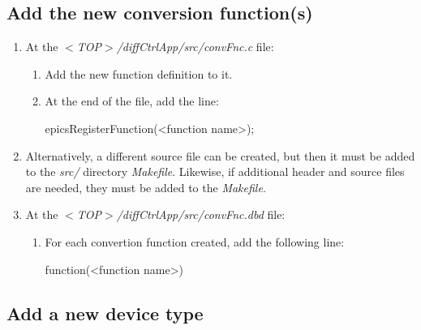 \documentclass[openany]{article}
\begin{document}
    \subsection{Add the new conversion function(s)}

        \begin{enumerate}
            \item At the \emph{$<$TOP$>$/diffCtrlApp/src/convFnc.c} file:
            \begin{enumerate}
                \item Add the new function definition to it.
                \item At the end of the file, add the line:
                \vspace{1mm}
                \begin{code}
epicsRegisterFunction(<function name>);
                \end{code}
                \vspace{1mm}
            \end{enumerate}
            \item Alternatively, a different source file can be created, but then it must be added to the \emph{src/} directory \emph{Makefile}. Likewise, if additional header and source files are needed, they must be added to the \emph{Makefile}.
            \item At the \emph{$<$TOP$>$/diffCtrlApp/src/convFnc.dbd} file:
            \begin{enumerate}
                \item For each convertion function created, add the following line:
                \vspace{1mm}
                \begin{code}
function(<function name>)
                \end{code}
                \vspace{1mm}
            \end{enumerate}
        \end{enumerate}

    \subsection{Add a new device type}
\end{document}
